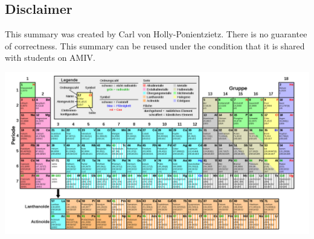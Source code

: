 \documentclass[a4paper,10pt,landscape]{scrartcl}
\begin{document}
\begin{multicols*}{3}
\section{Disclaimer}

This summary was created by Carl von Holly-Ponientzietz. There is no guarantee of correctness. This summary can be reused under the condition that it is shared with students on AMIV.

\end{multicols*}


%

\includegraphics[width = 1.03\textwidth]{src/periodictable.png}
\end{document}
